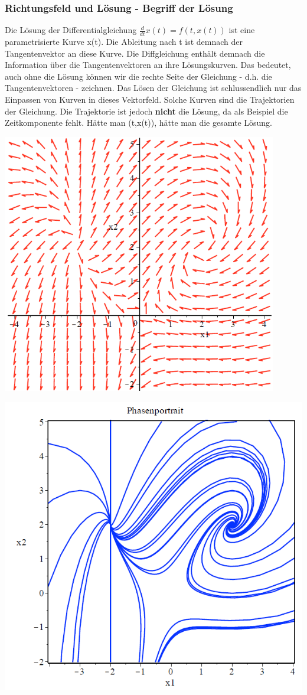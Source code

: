\subsubsection{Richtungsfeld und Lösung - Begriff der Lösung}
Die Lösung der Differentialgleichung $\frac{d}{dt}x(t) = f(t,x(t))$ ist eine parametrisierte Kurve x(t). Die Ableitung nach t ist demnach der Tangentenvektor an diese Kurve. Die Diffgleichung enthält demnach die Information über die Tangentenvektoren an ihre Lösungskurven. 
Das bedeutet, auch ohne die Lösung können wir die rechte Seite der Gleichung - d.h. die Tangentenvektoren - zeichnen. Das Lösen der Gleichung ist schlussendlich nur das Einpassen von Kurven in dieses Vektorfeld. Solche Kurven sind die Trajektorien der Gleichung. Die Trajektorie ist jedoch \textbf{nicht} die Lösung, da als Beispiel die Zeitkomponente fehlt. Hätte man (t,x(t)), hätte man die gesamte Lösung. 
\begin{minipage}[h]{0.35\textwidth} 
	\includegraphics[width=0.9\textwidth]{images/Vektorfeld.png}
\end{minipage}
\begin{minipage}[h]{0.35\textwidth}
	\includegraphics[width=1.0\textwidth]{images/Phasenportrait.png}
\end{minipage}